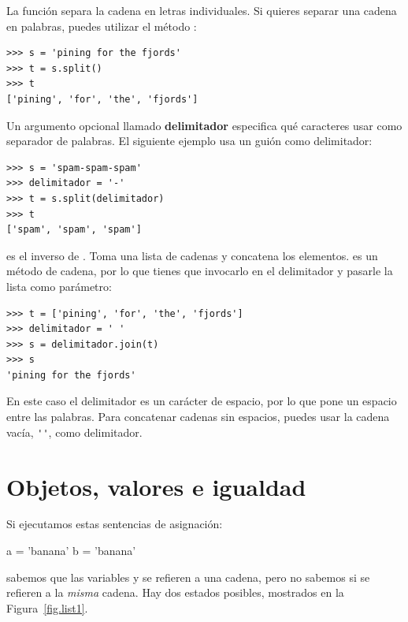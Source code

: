 La función  separa la cadena en letras individuales.  Si
quieres separar una cadena en palabras, puedes utilizar
el método :

\begin{Verbatim}[frame=single]
>>> s = 'pining for the fjords'
>>> t = s.split()
>>> t
['pining', 'for', 'the', 'fjords']
\end{Verbatim}
%
Un argumento opcional llamado \textbf{ delimitador} especifica qué
caracteres usar como separador de palabras.
El siguiente ejemplo
usa un guión como delimitador:

\begin{Verbatim}[frame=single]
>>> s = 'spam-spam-spam'
>>> delimitador = '-'
>>> t = s.split(delimitador)
>>> t
['spam', 'spam', 'spam']
\end{Verbatim}
%
 es el inverso de .
Toma una lista de cadenas y
concatena los elementos.   es un método de cadena,
por lo que tienes que invocarlo en el delimitador y pasarle la
lista como parámetro:

\begin{Verbatim}[frame=single]
>>> t = ['pining', 'for', 'the', 'fjords']
>>> delimitador = ' '
>>> s = delimitador.join(t)
>>> s
'pining for the fjords'
\end{Verbatim}
%
En este caso el delimitador es un carácter de espacio, por lo que
 pone un espacio entre las palabras.  Para concatenar
cadenas sin espacios, puedes usar la cadena vacía,
\verb"''", como delimitador.


\section{Objetos, valores e igualdad}
\label{equivalence}

Si ejecutamos estas sentencias de asignación:

\begin{python}[frame=single]
a = 'banana'
b = 'banana'
\end{python}
%
sabemos que las variables  y  se refieren a una
cadena, pero no sabemos si se refieren a la {\em misma} cadena.
Hay dos estados posibles, mostrados en la Figura~\ref{fig.list1}.

